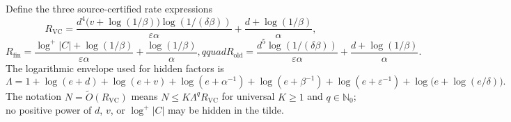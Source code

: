Define the three source-certified rate expressions
\[
 R_{\mathrm{VC}}=
 \frac{d^4\bigl(v+\log(1/\beta)\bigr)\log(1/(\delta\beta))}
      {\varepsilon\alpha}
 +\frac{d+\log(1/\beta)}{\alpha},
\]
\[
 R_{\mathrm{fin}}=
 \frac{\log^+|C|+\log(1/\beta)}{\varepsilon\alpha}
 +\frac{\log(1/\beta)}{\alpha},qquad
 R_{\mathrm{old}}=
 \frac{d^5\log(1/(\delta\beta))}{\varepsilon\alpha}
 +\frac{d+\log(1/\beta)}{\alpha}.
\]
The logarithmic envelope used for hidden factors is
\[
\Lambda=1+\log(e+d)+\log(e+v)+\log(e+\alpha^{-1})
 +\log(e+\beta^{-1})+\log(e+\varepsilon^{-1})
 +\log\!\bigl(e+\log(e/\delta)\bigr).
\]
The notation $N=\widetilde O(R_{\mathrm{VC}})$ means
$N\le K\Lambda^qR_{\mathrm{VC}}$ for universal $K\ge1$ and
$q\in\mathbb N_0$; no positive power of $d$, $v$, or $\log^+|C|$ may be
hidden in the tilde.
